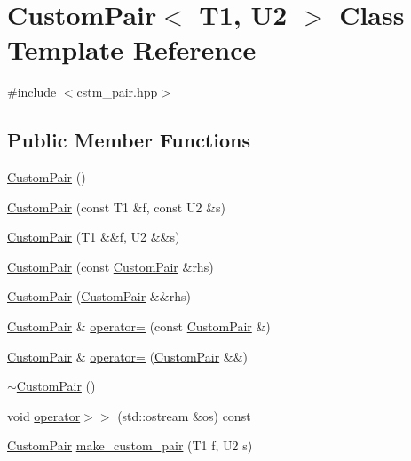 \hypertarget{classCustomPair}{}\section{Custom\+Pair$<$ T1, U2 $>$ Class Template Reference}
\label{classCustomPair}


{\ttfamily \#include $<$cstm\+\_\+pair.\+hpp$>$}

\subsection*{Public Member Functions}
\begin{DoxyCompactItemize}
\item 
\hyperlink{classCustomPair_a08267c93486d41377a8403e1e7109c4f}{Custom\+Pair} ()
\item 
\hyperlink{classCustomPair_abdaebfaee7292d2c83fb68373a5b19ca}{Custom\+Pair} (const T1 \&f, const U2 \&s)
\item 
\hyperlink{classCustomPair_ac81e98af29d37f8df7d8199f8185d4be}{Custom\+Pair} (T1 \&\&f, U2 \&\&s)
\item 
\hyperlink{classCustomPair_ad9b27b057afcf0bba10fd4ee27f6f336}{Custom\+Pair} (const \hyperlink{classCustomPair}{Custom\+Pair} \&rhs)
\item 
\hyperlink{classCustomPair_aeeabcac87aa65e6efc9cb3e2acd4cd2a}{Custom\+Pair} (\hyperlink{classCustomPair}{Custom\+Pair} \&\&rhs)
\item 
\hyperlink{classCustomPair}{Custom\+Pair} \& \hyperlink{classCustomPair_a0382ce4957c495f9d113feec0dd0fd0d}{operator=} (const \hyperlink{classCustomPair}{Custom\+Pair} \&)
\item 
\hyperlink{classCustomPair}{Custom\+Pair} \& \hyperlink{classCustomPair_a5eb9461e32ce141d4ac27312c36c6e4a}{operator=} (\hyperlink{classCustomPair}{Custom\+Pair} \&\&)
\item 
\hyperlink{classCustomPair_ac020a919f7416ce505190c396dc13d85}{$\sim$\+Custom\+Pair} ()
\item 
void \hyperlink{classCustomPair_af924734860d947883590406517cb56a8}{operator$>$$>$} (std\+::ostream \&os) const 
\item 
\hyperlink{classCustomPair}{Custom\+Pair} \hyperlink{classCustomPair_a7734ebd7a782940990888a46fc8e0b3e}{make\+\_\+custom\+\_\+pair} (T1 f, U2 s)
\end{DoxyCompactItemize}
